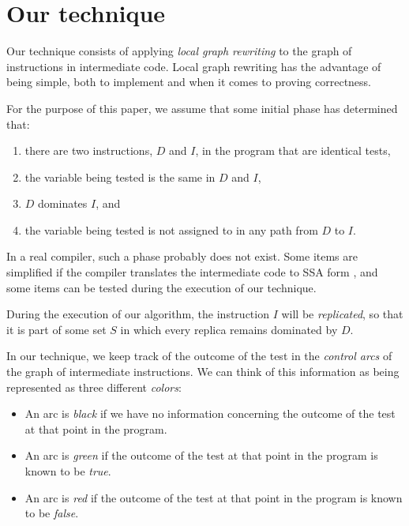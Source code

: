 \section{Our technique}

Our technique consists of applying \emph{local graph rewriting} to the
graph of instructions in intermediate code.  Local graph rewriting has
the advantage of being simple, both to implement and when it comes to
proving correctness.

For the purpose of this paper, we assume that some initial phase has
determined that:

\begin{enumerate}
\item there are two instructions, $D$ and $I$, in the program that
  are identical tests,
\item the variable being tested is the same in $D$ and $I$,
\item $D$ dominates $I$, and
\item the variable being tested is not assigned to in any path from
  $D$ to $I$.
\end{enumerate}

In a real compiler, such a phase probably does not exist.  Some items
are simplified if the compiler translates the intermediate code to SSA
form \cite{Cytron:1989:EMC:75277.75280,
  Cytron:1991:ECS:115372.115320}, and some items can be tested during
the execution of our technique.

During the execution of our algorithm, the instruction $I$ will be
\emph{replicated}, so that it is part of some set $S$ in which every
replica remains dominated by $D$.

In our technique, we keep track of the outcome of the test in the
\emph{control arcs} of the graph of intermediate instructions.
We can think of this information as being represented as three
different \emph{colors}:

\begin{itemize}
\item An arc is \emph{black} if we have no information concerning the
  outcome of the test at that point in the program.
\item An arc is \emph{green} if the outcome of the test at that point in
  the program is known to be \emph{true}.
\item An arc is \emph{red} if the outcome of the test at that point in
  the program is known to be \emph{false}.
\end{itemize}


